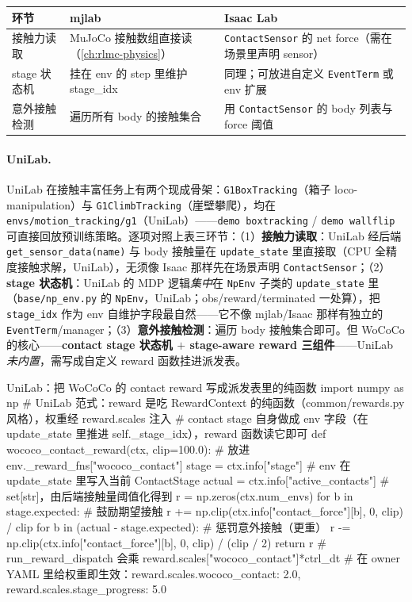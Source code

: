 \begin{center}
\small
\begin{tabular}{p{2.0cm}p{4.3cm}p{4.3cm}}
\hline
环节 & mjlab & Isaac Lab \\
\hline
接触力读取 & MuJoCo 接触数组直接读（\cref{ch:rlmc-physics}） & \texttt{ContactSensor} 的 net force（需在场景里声明 sensor） \\
stage 状态机 & 挂在 env 的 step 里维护 stage\_idx & 同理；可放进自定义 \texttt{EventTerm} 或 env 扩展 \\
意外接触检测 & 遍历所有 body 的接触集合 & 用 \texttt{ContactSensor} 的 body 列表与 force 阈值 \\
\hline
\end{tabular}
\end{center}

\paragraph{UniLab.}
UniLab 在接触丰富任务上有两个现成骨架：\texttt{G1BoxTracking}（箱子 loco-manipulation）与 \texttt{G1ClimbTracking}（崖壁攀爬），均在 \texttt{envs/motion\_tracking/g1}（UniLab）——\texttt{demo boxtracking} / \texttt{demo wallflip} 可直接回放预训练策略。逐项对照上表三环节：（1）\textbf{接触力读取}：UniLab 经后端 \verb|get_sensor_data(name)| 与 body 接触量在 \verb|update_state| 里直接取（CPU 全精度接触求解，UniLab），无须像 Isaac 那样先在场景声明 \verb|ContactSensor|；（2）\textbf{stage 状态机}：UniLab 的 MDP 逻辑\emph{集中}在 \verb|NpEnv| 子类的 \verb|update_state| 里（\texttt{base/np\_env.py} 的 \texttt{NpEnv}，UniLab；obs/reward/terminated 一处算），把 \verb|stage_idx| 作为 env 自维护字段最自然——它不像 mjlab/Isaac 那样有独立的 \verb|EventTerm|/manager；（3）\textbf{意外接触检测}：遍历 body 接触集合即可。但 WoCoCo 的核心——\textbf{contact stage 状态机 $+$ stage-aware reward 三组件}——UniLab \emph{未内置}，需写成自定义 reward 函数挂进派发表。

\begin{codebox}[Python]{UniLab：把 WoCoCo 的 contact reward 写成派发表里的纯函数}
import numpy as np
# UniLab 范式：reward 是吃 RewardContext 的纯函数（common/rewards.py 风格），权重经 reward.scales 注入
# contact stage 自身做成 env 字段（在 update_state 里推进 self._stage_idx），reward 函数读它即可
def wococo_contact_reward(ctx, clip=100.0):     # 放进 env._reward_fns["wococo_contact"]
    stage = ctx.info["stage"]                    # env 在 update_state 里写入当前 ContactStage
    actual = ctx.info["active_contacts"]         # set[str]，由后端接触量阈值化得到
    r = np.zeros(ctx.num_envs)
    for b in stage.expected:                      # 鼓励期望接触
        r += np.clip(ctx.info["contact_force"][b], 0, clip) / clip
    for b in (actual - stage.expected):           # 惩罚意外接触（更重）
        r -= np.clip(ctx.info["contact_force"][b], 0, clip) / (clip / 2)
    return r                                       # run_reward_dispatch 会乘 reward.scales["wococo_contact"]*ctrl_dt
# 在 owner YAML 里给权重即生效：reward.scales.wococo_contact: 2.0, reward.scales.stage_progress: 5.0
\end{codebox}


